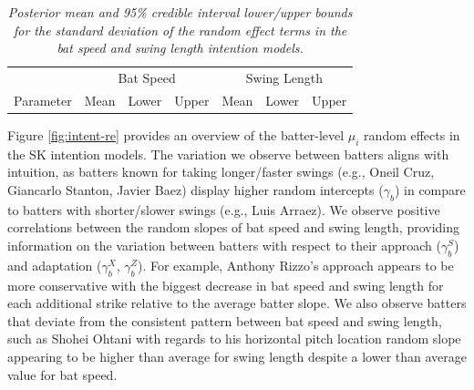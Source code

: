 \documentclass{article}
\begin{document}
      \begin{table}[H]
        \centering
        \begin{tabular}{l|rrr|rrr|}
                  & \multicolumn{3}{c|}{Bat Speed}          & \multicolumn{3}{c|}{Swing Length}  \\
        Parameter & Mean  & Lower  & Upper & Mean  & Lower  & Upper \\
          \hline
          
        \end{tabular}
        \caption{\it Posterior mean and 95\% credible interval lower/upper bounds for the standard deviation of the random effect terms in the bat speed and swing length intention models.}
        \label{tab:intention-variances}
      \end{table}

      Figure \ref{fig:intent-re} provides an overview of the batter-level $\mu_i$ random effects in the SK intention models. The variation we observe between batters aligns with intuition, as batters known for taking longer/faster swings (e.g., Oneil Cruz, Giancarlo Stanton, Javier Baez) display higher random intercepts ($\gamma_b$) in compare to batters with shorter/slower swings (e.g., Luis Arraez). We observe positive correlations between the random slopes of bat speed and swing length, providing information on the variation between batters with respect to their approach ($\gamma_b^S$) and adaptation ($\gamma_b^X$, $\gamma_b^Z$). For example, Anthony Rizzo's approach appears to be more conservative with the biggest decrease in bat speed and swing length for each additional strike relative to the average batter slope. We also observe batters that deviate from the consistent pattern between bat speed and swing length, such as Shohei Ohtani with regards to his horizontal pitch location random slope appearing to be higher than average for swing length despite a lower than average value for bat speed. 
      
\end{document}
